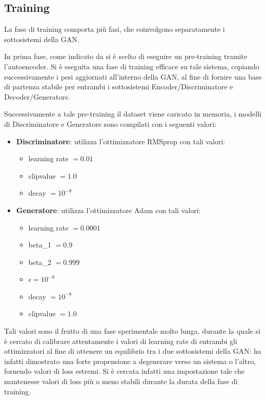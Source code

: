 \subsection{Training}
La fase di training comporta più fasi, che coinvolgono separatamente i sottosistemi della GAN.

In prima fase, come indicato da \cite{deepdga} si è scelto di eseguire un pre-training tramite l'autoencoder. Si è eseguita una fase di training efficace su tale sistema, copiando successivamente i pesi aggiornati all'interno della GAN, al fine di fornire una base di partenza stabile per entrambi i sottosistemi Encoder/Discriminatore e Decoder/Generatore.

Successivamente a tale pre-training il dataset viene caricato in memoria, i modelli di Discriminatore e Generatore sono compilati con i seguenti valori: 
\begin{itemize}
	\item \textbf{Discriminatore}: utilizza l'ottimizzatore RMSprop \cite{rmsprop} con tali valori: 
		\begin{itemize}
			\item learning rate $= 0.01$ 
			\item clipvalue $= 1.0$
			\item decay $= 10^{-8}$
		\end{itemize}
	\item \textbf{Generatore}: utilizza l'ottimizzatore Adam con tali valori:
	\begin{itemize}
		\item learning rate $= 0.0001$
		\item beta\_1 $= 0.9$
		\item beta\_2 $= 0.999$
		\item $\epsilon = 10^{-8}$
		\item decay $= 10^{-8}$
		\item clipvalue  $= 1.0$
	\end{itemize}
\end{itemize}

Tali valori sono il frutto di una fase sperimentale molto lunga, durante la quale si è cercato di calibrare attentamente i valori di learning rate di entrambi gli ottimizzatori al fine di ottenere un equilibrio tra i due sottosistemi della GAN: ha infatti dimostrato una forte propensione a degenerare verso un sistema o l'altro, fornendo valori di loss estremi. Si è cercata infatti una impostazione tale che mantenesse valori di loss più o meno stabili durante la durata della fase di training.

